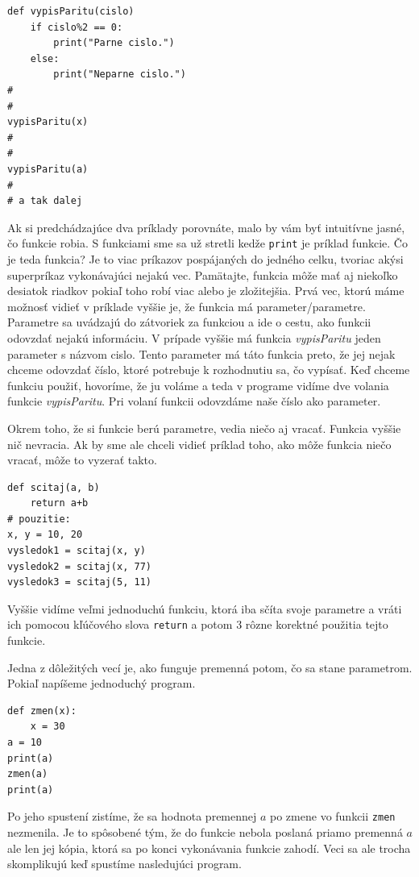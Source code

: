 \documentclass{article}
\begin{document}
\begin{lstlisting}
def vypisParitu(cislo)
    if cislo%2 == 0:
        print("Parne cislo.")
    else:
        print("Neparne cislo.")
#   
#
vypisParitu(x)
#
#
vypisParitu(a)
#
# a tak dalej
\end{lstlisting}

Ak si predchádzajúce dva príklady porovnáte, malo by vám byť intuitívne jasné, čo funkcie robia. S funkciami sme sa už stretli kedže \texttt{print} je príklad funkcie. Čo je teda funkcia? Je to viac príkazov pospájaných do jedného celku, tvoriac akýsi superpríkaz vykonávajúci nejakú vec. Pamätajte, funkcia môže mať aj niekoľko desiatok riadkov pokiaľ toho robí viac alebo je zložitejšia. Prvá vec, ktorú máme možnosť vidieť v príklade vyššie je, že funkcia má parameter/parametre. Parametre sa uvádzajú do zátvoriek za funkciou a ide o cestu, ako funkcii odovzdať nejakú informáciu. V prípade vyššie má funkcia \textit{vypisParitu} jeden parameter s názvom cislo. Tento parameter má táto funkcia preto, že jej nejak chceme odovzdať číslo, ktoré potrebuje k rozhodnutiu sa, čo vypísať. Keď chceme funkciu použiť, hovoríme, že ju voláme a teda v programe vidíme dve volania funkcie \textit{vypisParitu}. Pri volaní funkcii odovzdáme naše číslo ako parameter.

Okrem toho, že si funkcie berú parametre, vedia niečo aj vracať. Funkcia vyššie nič nevracia. Ak by sme ale chceli vidieť príklad toho, ako môže funkcia niečo vracať, môže to vyzerať takto.

\begin{lstlisting}
def scitaj(a, b)
    return a+b
# pouzitie:
x, y = 10, 20
vysledok1 = scitaj(x, y)
vysledok2 = scitaj(x, 77)
vysledok3 = scitaj(5, 11)
\end{lstlisting}

Vyššie vidíme veľmi jednoduchú funkciu, ktorá iba sčíta svoje parametre a vráti ich pomocou kľúčového slova \texttt{return} a potom 3 rôzne korektné použitia tejto funkcie.

Jedna z dôležitých vecí je, ako funguje premenná potom, čo sa stane parametrom. Pokiaľ napíšeme jednoduchý program.

\begin{lstlisting}
def zmen(x):
    x = 30
a = 10
print(a)
zmen(a)
print(a)
\end{lstlisting}

Po jeho spustení zistíme, že sa hodnota premennej $a$ po zmene vo funkcii \texttt{zmen} nezmenila. Je to spôsobené tým, že do funkcie nebola poslaná priamo premenná $a$ ale len jej kópia, ktorá sa po konci vykonávania funkcie zahodí. Veci sa ale trocha skomplikujú keď spustíme nasledujúci program.
\end{document}
